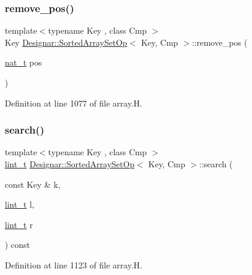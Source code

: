 \subsubsection{\texorpdfstring{remove\+\_\+pos()}{remove\_pos()}}
{\footnotesize\ttfamily template$<$typename Key , class Cmp $>$ \\
Key \hyperlink{class_designar_1_1_sorted_array_set_op}{Designar\+::\+Sorted\+Array\+Set\+Op}$<$ Key, Cmp $>$\+::remove\+\_\+pos (\begin{DoxyParamCaption}\item[{\hyperlink{namespace_designar_aa72662848b9f4815e7bf31a7cf3e33d1}{nat\+\_\+t}}]{pos }\end{DoxyParamCaption})\hspace{0.3cm}{\ttfamily [inline]}}



Definition at line 1077 of file array.\+H.

\mbox{\label{class_designar_1_1_sorted_array_set_op_ab0dc92fe501e3349041aaafea39a6526}} 
\subsubsection{\texorpdfstring{search()}{search()}}
{\footnotesize\ttfamily template$<$typename Key , class Cmp $>$ \\
\hyperlink{namespace_designar_a9d113d66a39e82b73727c72cd3a52f73}{lint\+\_\+t} \hyperlink{class_designar_1_1_sorted_array_set_op}{Designar\+::\+Sorted\+Array\+Set\+Op}$<$ Key, Cmp $>$\+::search (\begin{DoxyParamCaption}\item[{const Key \&}]{k,  }\item[{\hyperlink{namespace_designar_a9d113d66a39e82b73727c72cd3a52f73}{lint\+\_\+t}}]{l,  }\item[{\hyperlink{namespace_designar_a9d113d66a39e82b73727c72cd3a52f73}{lint\+\_\+t}}]{r }\end{DoxyParamCaption}) const\hspace{0.3cm}{\ttfamily [protected]}}



Definition at line 1123 of file array.\+H.

\mbox{\label{class_designar_1_1_sorted_array_set_op_a4daae3c1bd56ec08a02ce5a5f231aade}} 
